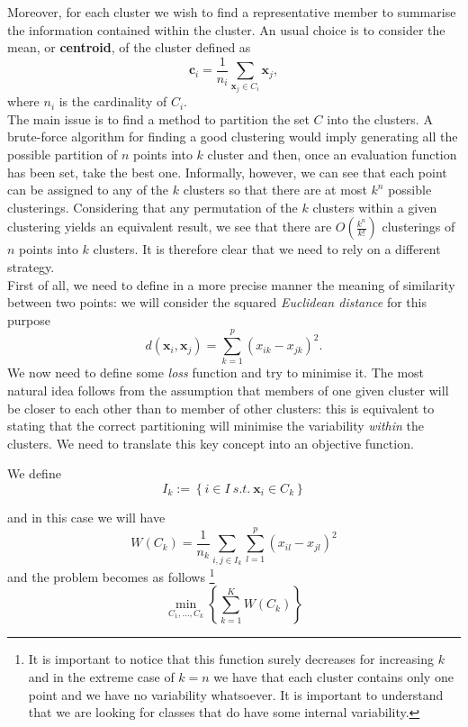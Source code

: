 \documentclass[a4paper]{article}
\begin{document}
	Moreover, for each cluster we wish to find a representative member to summarise the information contained within the cluster. An usual choice is to consider the mean, or \textbf{centroid}, of the cluster defined as
	\begin{equation*}
	\boldsymbol{c}_{i} = \frac{1}{n_{i}} \sum_{\boldsymbol{x}_{j} \in C_{i}} \boldsymbol{x}_{j},
	\end{equation*}
	where $n_{i}$ is the cardinality of $C_{i}$.\\

	The main issue is to find a method to partition the set $C$ into
	the clusters. A brute-force algorithm for finding a good clustering would imply generating all the possible partition of $n$ points into $k$ cluster and then, once an evaluation function has been set, take the best one. Informally, however, we can see that each point can be assigned to any of the $k$ clusters so that there are at most $k^{n}$ possible clusterings. Considering that any permutation of the $k$ clusters within a given clustering yields an equivalent result, we see that there are $O(\frac{k^{n}}{k!})$ clusterings of $n$ points into $k$ clusters. It is therefore clear that we need to rely on a different strategy.\\


	First of all, we need to define in a more precise manner
	the meaning of similarity between two points: we will consider the squared \textsl{Euclidean
		distance} for this purpose
	$$
	d(\boldsymbol{x}_{i},\boldsymbol{x}_{j})= \sum_{k = 1}^{p} \left( x_{ik} - x_{jk}
	\right)^{2}.
	$$
	We now need to define some \textsl{loss} function and try to minimise
	it. The most natural idea follows from the assumption that members
	of one given cluster will be closer to each other than to member of
	other clusters: this is equivalent to stating that the correct partitioning
	will minimise the variability \textsl{within} the clusters. We need
	to translate this key concept into an objective function.

	We define
	$$
	I_{k}:=\left\{ i\in I\:s.t.\:\boldsymbol{x}_{i}\in C_{k}\right\}
	$$

	and in this case we will have
	$$
	W(C_{k}) = \frac{1}{n_{k}} \underset{i,j\in I_{k}}{\sum} \sum_{l=1}^{p} \left(x_{il}-x_{jl}\right)^{2}
	$$
	and the problem becomes as follows
	\footnote{It is important to notice that this function surely decreases for
		increasing $k$ and in the extreme case of $k=n$ we have that each
		cluster contains only one point and we have no variability whatsoever.
		It is important to understand that we are looking for classes that
		do have some internal variability.}
	$$	\underset{C_{1},\ldots,C_{k}}{\min}\left\{ \sum_{k=1}^{K}W(C_{k})\right\} $$
\end{document}

